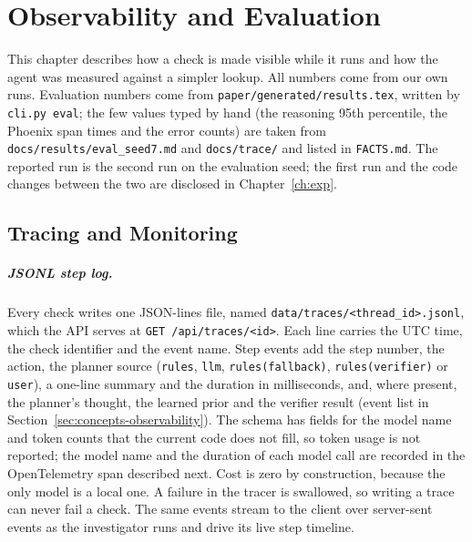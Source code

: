 \chapter{Observability and Evaluation}
\label{ch:eval}

This chapter describes how a check is made visible while it runs and how the agent was measured
against a simpler lookup. All numbers come from our own runs. Evaluation numbers come from
\texttt{paper/generated/results.tex}, written by \texttt{cli.py eval}; the few values typed by hand
(the reasoning 95th percentile, the Phoenix span times and the error counts) are taken from
\texttt{docs/results/eval\_seed7.md} and \texttt{docs/trace/} and listed in \texttt{FACTS.md}. The reported run is the second run on the evaluation seed; the first run and the
code changes between the two are disclosed in Chapter~\ref{ch:exp}.

\section{Tracing and Monitoring}
\label{sec:eval-tracing-and-monitoring}

\begingroup\setlength{\emergencystretch}{3em}
\paragraph{JSONL step log.} Every check writes one JSON-lines file, named
\texttt{data/\allowbreak traces/\allowbreak <thread\_id>.jsonl}, which the API serves at \texttt{GET /api/traces/<id>}.
Each line carries the UTC time, the check identifier and the event name. Step events add the step
number, the action, the planner source (\texttt{rules}, \texttt{llm}, \texttt{rules(fallback)},
\texttt{rules(verifier)} or \texttt{user}), a one-line summary and the duration in milliseconds, and,
where present, the planner's thought, the learned prior and the verifier result (event list in
Section~\ref{sec:concepts-observability}). The schema has fields for the model name and token
counts that the current code does not fill, so token usage is not reported; the model name and the
duration of each model call are recorded in the OpenTelemetry span described next. Cost is zero by
construction, because the only model is a local one. A failure in the tracer is swallowed, so
writing a trace can never fail a check. The same events stream to the client over server-sent
events as the investigator runs and drive its live step timeline.\par\endgroup

